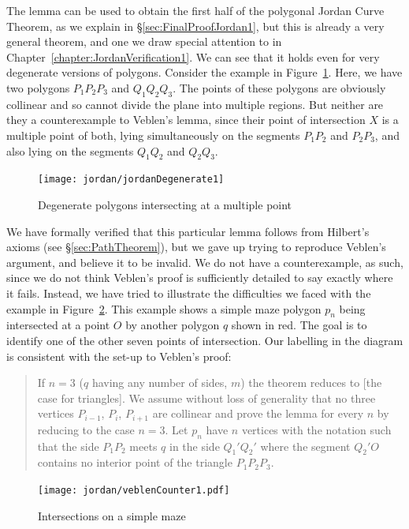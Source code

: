 The lemma can be used to obtain the first half of the polygonal Jordan Curve Theorem, as we explain in \S\ref{sec:FinalProofJordan1}, but this is already a very general theorem, and one we draw special attention to in Chapter~\ref{chapter:JordanVerification1}. We can see that it holds even for very degenerate versions of polygons. Consider the example in Figure~\ref{fig:jordanDegenerate1}. Here, we have two polygons $P_1P_2P_3$ and $Q_1Q_2Q_3$. The points of these polygons are obviously collinear and so cannot divide the plane into multiple regions. But neither are they a counterexample to Veblen's lemma, since their point of intersection $X$ is a multiple point of both, lying simultaneously on the segments $P_1P_2$ and $P_2P_3$, and also lying on the segments $Q_1Q_2$ and $Q_2Q_3$.

\begin{figure}
\centering
\texttt{[image: jordan/jordanDegenerate1]}
\caption{Degenerate polygons intersecting at a multiple point}
\label{fig:jordanDegenerate1}
\end{figure}

We have formally verified that this particular lemma follows from Hilbert's axioms (see \S\ref{sec:PathTheorem}), but we gave up trying to reproduce Veblen's argument, and believe it to be invalid. We do not have a counterexample, as such, since we do not think Veblen's proof is sufficiently detailed to say exactly where it fails. Instead, we have tried to illustrate the difficulties we faced with the example in Figure~\ref{fig:VeblenCounter1}. This example shows a simple maze polygon $p_n$ being intersected at a point $O$ by another polygon $q$ shown in red. The goal is to identify one of the other seven points of intersection. Our labelling in the diagram is consistent with the set-up to Veblen's proof:

\begin{quote}
If $n=3$ ($q$ having any number of sides, $m$) the theorem reduces to [the case for triangles]. We assume without loss of generality that no three vertices $P_{i-1}$, $P_i$, $P_{i+1}$ are collinear and prove the lemma for every $n$ by reducing to the case $n=3$. Let $p_n$ have $n$ vertices with the notation such that the side $P_1P_2$ meets $q$ in the side $Q_1'Q_2'$ where the segment $Q_2'O$ contains no interior point of the triangle $P_1P_2P_3$.\end{quote}

\begin{figure}
\centering
\texttt{[image: jordan/veblenCounter1.pdf]}
\caption{Intersections on a simple maze}
\label{fig:VeblenCounter1}
\end{figure}

